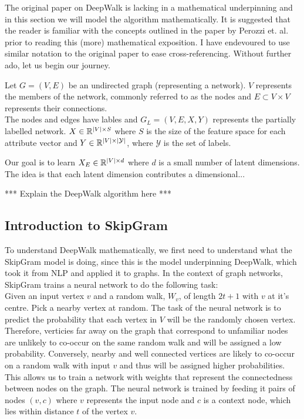 \documentclass[a4paper]{article}
\begin{document}
The original paper on DeepWalk is lacking in a mathematical underpinning and in
this section we will model the algorithm mathematically. It is suggested that the reader
is familiar with the concepts outlined in the paper by Perozzi et. al. prior to
reading this (more) mathematical exposition. I have endevoured to use similar
notation to the original paper to ease cross-referencing. Without further ado, let us begin
our journey.

\begin{definition}
  Let $G = (V, E)$ be an undirected graph (representing a network). $V$ represents the
  members of the network, commonly referred to as the nodes and $E \subset V
  \times V$ represents their connections.\\

  The nodes and edges have lables and $G_L = (V, E, X, Y)$ represents the
  partially labelled network. $X \in \R^{|V| \times S}$ where $S$ is the size of
  the feature space for each attribute vector and $Y \in \R^{|V| \times
    |\mathcal{Y}|}$, where $\mathcal{Y}$ is the set of labels.
\end{definition}

Our goal is to learn $X_E \in \R^{|V| \times d}$ where $d$ is a small number
of latent dimensions. The idea is that each latent dimension contributes a 
dimensional...

*** Explain the DeepWalk algorithm here ***

\subsection{Introduction to SkipGram}
To understand DeepWalk mathematically, we first need to understand what the SkipGram
model is doing, since this is the model underpinning DeepWalk, which took it
from NLP and applied it to graphs. In the context of graph networks, SkipGram trains a neural network to do the
following task:\\
Given an input vertex $v$ and a random walk, $W_{v}$, of length $2t+1$ with $v$
at it's centre. Pick a nearby vertex at random. The task of the neural network is to
predict the probability that each vertex in $V$ will be the randomly chosen
vertex. Therefore, verticies far away on the graph that correspond to unfamiliar
nodes are unlikely to co-occur on the same random walk and will be assigned a
low probability. Conversely, nearby and well connected vertices are likely to
co-occur on a random walk with input $v$ and thus will be assigned higher
probabilities. This allows us to train a network with weights that represent the
connectedness between nodes on the graph. The neural network is trained by
feeding it pairs of nodes $(v, c)$ where $v$ represents the input node and $c$ is a context node, which lies within distance
$t$ of the vertex $v$.\\ 
\end{document}
